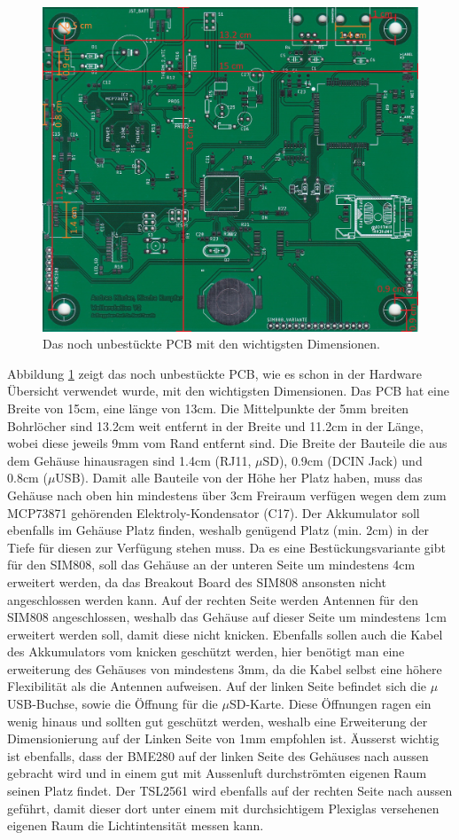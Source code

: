 \begin{figure}[h]
\centering
\includegraphics[width=0.9\linewidth]{graphics/Gehaeuse/PCB_Dimensionen.jpg}
\caption{Das noch unbestückte PCB mit den wichtigsten Dimensionen.}
\label{fig:Dimensionen1}
\end{figure}
\newpage
Abbildung \ref{fig:Dimensionen1} zeigt das noch unbestückte PCB, wie es schon in der Hardware Übersicht verwendet wurde, mit den wichtigsten Dimensionen. Das PCB hat eine Breite von 15cm, eine länge von 13cm. Die Mittelpunkte der 5mm breiten Bohrlöcher sind 13.2cm weit entfernt in der Breite und 11.2cm in der Länge, wobei diese jeweils 9mm vom Rand entfernt sind. Die Breite der Bauteile die aus dem Gehäuse hinausragen sind 1.4cm (RJ11, $\mu$SD), 0.9cm (DCIN Jack) und 0.8cm ($\mu$USB). Damit alle Bauteile von der Höhe her Platz haben, muss das Gehäuse nach oben hin mindestens über 3cm Freiraum verfügen wegen dem zum MCP73871 gehörenden Elektroly-Kondensator (C17). Der Akkumulator soll ebenfalls im Gehäuse Platz finden, weshalb genügend Platz (min. 2cm) in der Tiefe für diesen zur Verfügung stehen muss. Da es eine Bestückungsvariante gibt für den SIM808, soll das Gehäuse an der unteren Seite um mindestens 4cm erweitert werden, da das Breakout Board des SIM808 ansonsten nicht angeschlossen werden kann. Auf der rechten Seite werden Antennen für den SIM808 angeschlossen, weshalb das Gehäuse auf dieser Seite um mindestens 1cm erweitert werden soll, damit diese nicht knicken. Ebenfalls sollen auch die Kabel des Akkumulators vom knicken geschützt werden, hier benötigt man eine erweiterung des Gehäuses von mindestens 3mm, da die Kabel selbst eine höhere Flexibilität als die Antennen aufweisen. Auf der linken Seite befindet sich die $\mu$USB-Buchse, sowie die Öffnung für die $\mu$SD-Karte. Diese Öffnungen ragen ein wenig hinaus und sollten gut geschützt werden, weshalb eine Erweiterung der Dimensionierung auf der Linken Seite von 1mm empfohlen ist. Äusserst wichtig ist ebenfalls, dass der BME280 auf der linken Seite des Gehäuses nach aussen gebracht wird und in einem gut mit Aussenluft durchströmten eigenen Raum seinen Platz findet. Der TSL2561 wird ebenfalls auf der rechten Seite nach aussen geführt, damit dieser dort unter einem mit durchsichtigem Plexiglas versehenen eigenen Raum die Lichtintensität messen kann.\\[0.5cm]
